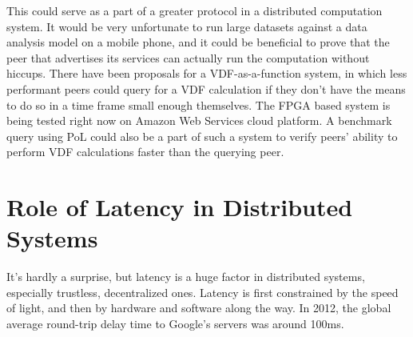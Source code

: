 This could serve as a part of a greater protocol in a distributed computation system. It would be very unfortunate to run large datasets against a data analysis model on a mobile phone, and it could be beneficial to prove that the peer that advertises its services can actually run the computation without hiccups.
There have been proposals for a VDF-as-a-function system, in which less performant peers could query for a VDF calculation if they don't have the means to do so in a time frame small enough themselves. The FPGA based system is being tested right now on Amazon Web Services cloud platform. A benchmark query using PoL could also be a part of such a system to verify peers' ability to perform VDF calculations faster than the querying peer.

\section{Role of Latency in Distributed Systems}
It's hardly a surprise, but latency is a huge factor in distributed systems, especially trustless, decentralized ones. Latency is first constrained by the speed of light, and then by hardware and software along the way. In 2012, the global average round-trip delay time to Google's servers was around 100ms.~\cite{Grigorik_undated-mc}

